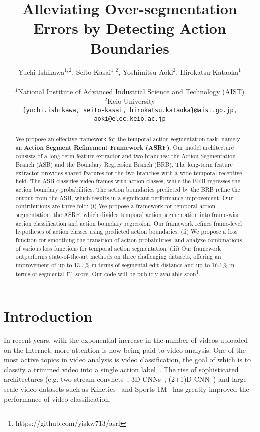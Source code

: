 \documentclass[10pt,twocolumn,letterpaper]{article}
\begin{document}
\title{Alleviating Over-segmentation Errors by Detecting Action Boundaries}

\author{
Yuchi Ishikawa$^{1, 2}$, Seito Kasai$^{1, 2}$, Yoshimitsu Aoki$^2$, Hirokatsu Kataoka$^1$\\
\\$^1$National Institute of Advanced Industrial Science and Technology (AIST)\\
$^2$Keio University\\
{\tt\small\{yuchi.ishikawa, seito-kasai, hirokatsu.kataoka\}@aist.go.jp, aoki@elec.keio.ac.jp}
}

\maketitle
\begin{abstract}
We propose an effective framework for the temporal action segmentation task, namely an \textbf{Action Segment Refinement Framework (ASRF)}.
Our model architecture consists of a long-term feature extractor and two branches: the Action Segmentation Branch (ASB) and the Boundary Regression Branch (BRB).
The long-term feature extractor provides shared features for the two branches with a wide temporal receptive field.
The ASB classifies video frames with action classes, while the BRB regresses the action boundary probabilities.
The action boundaries predicted by the BRB refine the output from the ASB, which results in a significant performance improvement.
Our contributions are three-fold: (i) We propose a framework for temporal action segmentation, the ASRF,
which divides temporal action segmentation into frame-wise action classification and action boundary regression.
Our framework refines frame-level hypotheses of action classes using predicted action boundaries.
(ii) We propose a loss function for smoothing the transition of action probabilities, and analyze combinations of various loss functions for temporal action segmentation.
(iii) Our framework outperforms state-of-the-art methods on three challenging datasets, offering an improvement of up to 13.7\% in terms of segmental edit distance and up to 16.1\% in terms of segmental F1 score.
Our code will be publicly available soon\footnote{https://github.com/yiskw713/asrf}.
\end{abstract}


\vspace{-5pt}
\section{Introduction}
In recent years, with the exponential increase in the number of videos uploaded on the Internet, more attention is now being paid to video analysis. 
One of the most active topics in video analysis is video classification, the goal of which is to classify a trimmed video into a single action label~\cite{AggarwalCSUR2011}. The rise of sophisticated architectures (e.g. two-stream convnets~\cite{SimonyanNIPS2014,FeichtenhoferCVPR2016}, 3D CNNs~\cite{TranICCV2015,CarreiraCVPR2017,HaraCVPR2018,s3d,slowfast,x3d}, (2+1)D CNN~\cite{TranCVPR2018}) and large-scale video datasets such as Kinetics~\cite{KayarXiv2017,Carreiraarxiv2019} and Sports-1M~\cite{KarpathyCVPR2014} has greatly improved the performance of video classification.
\end{document}
